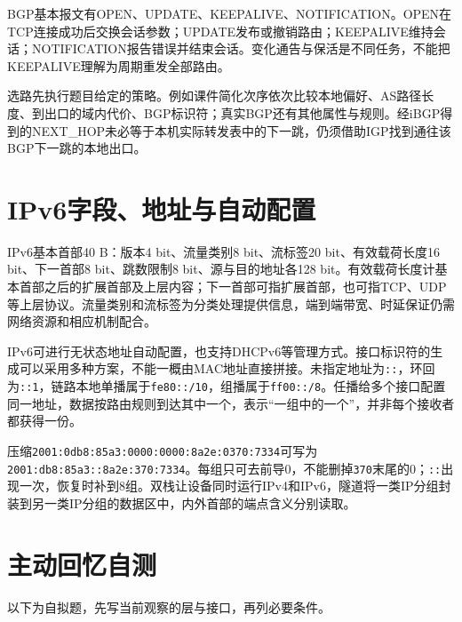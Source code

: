 BGP基本报文有OPEN、UPDATE、KEEPALIVE、NOTIFICATION。OPEN在TCP连接成功后交换会话参数；UPDATE发布或撤销路由；KEEPALIVE维持会话；NOTIFICATION报告错误并结束会话。变化通告与保活是不同任务，不能把KEEPALIVE理解为周期重发全部路由。

选路先执行题目给定的策略。例如课件简化次序依次比较本地偏好、AS路径长度、到出口的域内代价、BGP标识符；真实BGP还有其他属性与规则。经iBGP得到的NEXT\_HOP未必等于本机实际转发表中的下一跳，仍须借助IGP找到通往该BGP下一跳的本地出口。

\section{IPv6字段、地址与自动配置}\label{CN04-course-ipv6}

IPv6基本首部40 B：版本4 bit、流量类别8 bit、流标签20 bit、有效载荷长度16 bit、下一首部8 bit、跳数限制8 bit、源与目的地址各128 bit。有效载荷长度计基本首部之后的扩展首部及上层内容；下一首部可指扩展首部，也可指TCP、UDP等上层协议。流量类别和流标签为分类处理提供信息，端到端带宽、时延保证仍需网络资源和相应机制配合。

IPv6可进行无状态地址自动配置，也支持DHCPv6等管理方式。接口标识符的生成可以采用多种方案，不能一概由MAC地址直接拼接。未指定地址为\texttt{:\allowbreak{}:\allowbreak{}}，环回为\texttt{:\allowbreak{}:\allowbreak{}1}，链路本地单播属于\texttt{fe80:\allowbreak{}:\allowbreak{}/\allowbreak{}10}，组播属于\texttt{ff00:\allowbreak{}:\allowbreak{}/\allowbreak{}8}。任播给多个接口配置同一地址，数据按路由规则到达其中一个，表示``一组中的一个''，并非每个接收者都获得一份。

压缩\texttt{2001:\allowbreak{}0db8:\allowbreak{}85a3:\allowbreak{}0000:\allowbreak{}0000:\allowbreak{}8a2e:\allowbreak{}0370:\allowbreak{}7334}可写为\texttt{2001:\allowbreak{}db8:\allowbreak{}85a3:\allowbreak{}:\allowbreak{}8a2e:\allowbreak{}370:\allowbreak{}7334}。每组只可去前导0，不能删掉\texttt{370}末尾的0；\texttt{:\allowbreak{}:\allowbreak{}}出现一次，恢复时补到8组。双栈让设备同时运行IPv4和IPv6，隧道将一类IP分组封装到另一类IP分组的数据区中，内外首部的端点含义分别读取。

\section{主动回忆自测}\label{CN04-review}

以下为自拟题，先写当前观察的层与接口，再列必要条件。

